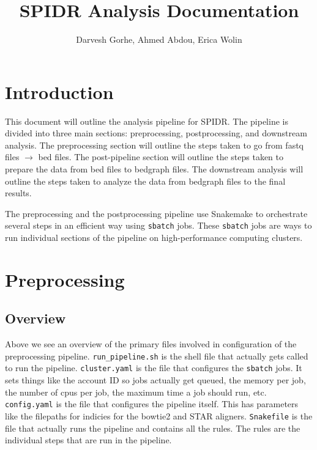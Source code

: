 \documentclass{article}
\title{SPIDR Analysis Documentation}
\author{Darvesh Gorhe, Ahmed Abdou, Erica Wolin}
\begin{document}
    \maketitle
    \tableofcontents

    \section{Introduction}
    This document will outline the analysis pipeline for SPIDR. The pipeline is divided into three main sections: preprocessing, postprocessing, and downstream analysis. The preprocessing section will outline the steps taken to go from fastq files $\rightarrow$ bed files. The post-pipeline section will outline the steps taken to prepare the data from bed files to bedgraph files. The downstream analysis will outline the steps taken to analyze the data from bedgraph files to the final results.
    \vspace{5mm}

    \noindent The preprocessing and the postprocessing pipeline use Snakemake to orchestrate several steps in an efficient way using \texttt{sbatch} jobs. These \texttt{sbatch} jobs are ways to run individual sections of the pipeline on high-performance computing clusters.

    \section{Preprocessing}
    \subsection{Overview}

    \noindent Above we see an overview of the primary files involved in configuration of the preprocessing pipeline. \texttt{run\_pipeline.sh} is the shell file that actually gets called to run the pipeline. \texttt{cluster.yaml} is the file that configures the \texttt{sbatch} jobs. It sets things like the account ID so jobs actually get queued, the memory per job, the number of cpus per job, the maximum time a job should run, etc. \texttt{config.yaml} is the file that configures the pipeline itself. This has parameters like the filepaths for indicies for the bowtie2 and STAR aligners. \texttt{Snakefile} is the file that actually runs the pipeline and contains all the rules. The rules are the individual steps that are run in the pipeline. 
    \vspace{5mm}
    
\end{document}
